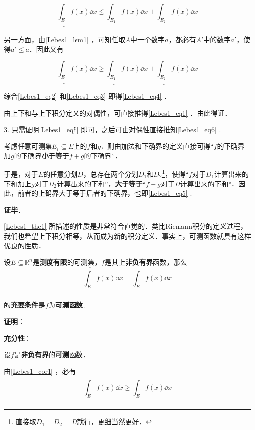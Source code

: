  \begin{equation}\label{Lebes1_eq2}
  \underline{\int_E} f(x) \dd x \leq \underline{\int_{E_1}} f(x) \dd x+\underline{\int_{E_2}} f(x) \dd x
  \end{equation}

另一方面，由\autoref{Lebes1_lem1} ，可知任取$A$中一个数字$a$，都必有$A'$中的数字$a'$，使得$a'\leq a$．因此又有

\begin{equation}\label{Lebes1_eq3}
\underline{\int_E} f(x) \dd x \geq \underline{\int_{E_1}} f(x) \dd x+\underline{\int_{E_2}} f(x) \dd x
\end{equation}

综合\autoref{Lebes1_eq2} 和\autoref{Lebes1_eq3} 即得\autoref{Lebes1_eq4} ．

由上下和与上下积分定义的对偶性，可直接推得\autoref{Lebes1_eq1} ．由此得证．

3. 只需证明\autoref{Lebes1_eq5} 即可，之后可由对偶性直接推知\autoref{Lebes1_eq6} .

考虑任意可测集$E_i\subseteq E$上的$f$和$g$，则由加法和下确界的定义直接可得“$f$的下确界加$g$的下确界\textbf{小于等于}$f+g$的下确界”．

于是，对于$E$的任意分划$D$，总存在两个分划$D_1$和$D_2$\footnote{直接取$D_1=D_2=D$就行，更细当然更好．}，使得“$f$对于$D_1$计算出来的下和加上$g$对于$D_2$计算出来的下和”，\textbf{大于等于}“$f+g$对于$D$计算出来的下和”．因此，前者的上确界大于等于后者的下确界，也即\autoref{Lebes1_eq5} .

\textbf{证毕}．


\autoref{Lebes1_the1} 所描述的性质是非常符合直觉的．类比Riemann积分的定义过程，我们也希望上下积分相等，从而成为新的积分定义．事实上，可测函数就具有这样优良的性质．

\begin{theorem}{}\label{Lebes1_the2}
设$E\subseteq \mathbb{R}^n$是\textbf{测度有限}的可测集，$f$是其上\textbf{非负有界}函数，那么
\begin{equation}\label{Lebes1_eq7}
\overline{\int_E} f(x) \dd x = \underline{\int_E} f(x) \dd x
\end{equation}
\end{theorem}
的\textbf{充要条件}是$f$为\textbf{可测函数}．


\textbf{证明}：

\textbf{充分性}：

设$f$是\textbf{非负有界}的\textbf{可测}函数．

由\autoref{Lebes1_cor1} ，必有
\begin{equation}
\overline{\int_E} f(x) \dd x \geq \underline{\int_E} f(x) \dd x
\end{equation}

